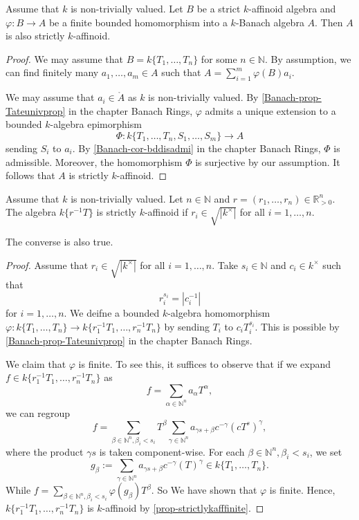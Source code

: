 \begin{proposition}\label{prop-strictlykafffinite}
    Assume that $k$ is non-trivially valued.
    Let $B$ be a strict $k$-affinoid algebra and $\varphi:B\rightarrow A$ be a finite bounded homomorphism into a $k$-Banach algebra $A$. Then $A$ is also strictly $k$-affinoid.
\end{proposition}
\begin{proof}
    We may assume that $B=k\{T_1,\ldots,T_n\}$ for some $n\in \mathbb{N}$. By assumption, we can find finitely many $a_1,\ldots,a_m\in A$ such that $A=\sum_{i=1}^m \varphi(B)a_i$.

    We may assume that $a_i\in \mathring{A}$ as $k$ is non-trivially valued. By \cref{Banach-prop-Tateunivprop} in the chapter Banach Rings, $\varphi$ admits a unique extension to a bounded $k$-algebra epimorphism 
    \[
        \Phi:  k\{T_1,\ldots,T_n,S_1,\ldots,S_m\}\rightarrow A
    \]
    sending $S_i$ to $a_i$. By \cref{Banach-cor-bddisadmi} in the chapter Banach Rings, $\Phi$ is admissible. Moreover, the homomorphism $\Phi$ is surjective by our assumption. It follows that $A$ is strictly $k$-affinoid.
\end{proof}

\begin{lemma}\label{lma-tatestrictaff}
    Assume that $k$ is non-trivially valued.
    Let $n\in \mathbb{N}$ and $r=(r_1,\ldots,r_n)\in \mathbb{R}^n_{>0}$. The algebra $k\{r^{-1}T\}$ is strictly $k$-affinoid if $r_i\in \sqrt{|k^{\times}|}$ for all $i=1,\ldots,n$.
\end{lemma}
\begin{remark}
    The converse is also true.     
\end{remark}

\begin{proof}
    Assume that $r_i\in \sqrt{|k^{\times}|}$ for all $i=1,\ldots,n$. Take $s_i\in \mathbb{N}$ and $c_i\in k^{\times}$ such that 
    \[
        r_i^{s_i}=|c_i^{-1}|  
    \]
    for $i=1,\ldots,n$. We deifne a bounded $k$-algebra homomorphism $\varphi:k\{T_1,\ldots,T_n\}\rightarrow k\{r_1^{-1}T_1,\ldots,r_n^{-1}T_n\}$ by sending $T_i$ to $c_iT_i^{s_i}$. This is possible by \cref{Banach-prop-Tateunivprop} in the chapter Banach Rings.

    We claim that $\varphi$ is finite. To see this, it suffices to observe that if we expand $f\in k\{r_1^{-1}T_1,\ldots,r_n^{-1}T_n\}$ as
    \[
        f=\sum_{\alpha \in \mathbb{N}^n} a_{\alpha}T^{\alpha},  
    \]
    we can regroup
    \[
        f=\sum_{\beta \in \mathbb{N}^n, \beta_i<s_i} T^{\beta}\sum_{\gamma\in \mathbb{N}^n} a_{\gamma s+\beta}c^{-\gamma} (cT^s)^{\gamma},
    \]
    where the product $\gamma s$ is taken component-wise. For each $\beta \in \mathbb{N}^n, \beta_i<s_i$, we set
    \[
        g_{\beta}:=\sum_{\gamma\in \mathbb{N}^n} a_{\gamma s+\beta}c^{-\gamma} (T)^{\gamma}\in k\{T_1,\ldots,T_n\}.
    \]  
    While $f=\sum_{\beta \in \mathbb{N}^n, \beta_i<s_i} \varphi(g_{\beta})T^{\beta}$. So We have shown that $\varphi$ is finite. Hence, $k\{r_1^{-1}T_1,\ldots,r_n^{-1}T_n\}$ is $k$-affinoid by \cref{prop-strictlykafffinite}.
\end{proof}


